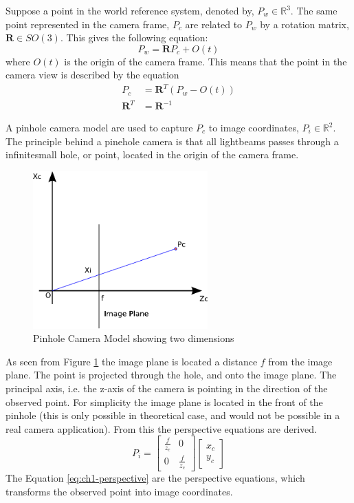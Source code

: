 	Suppose a point in the world reference system, denoted by, $P_w \in \mathbb{R}^3$. The same point
	represented in the camera frame, $P_c$ are related to $P_w$ by a rotation matrix, $\mathbf{R} \in
	SO(3)$. This gives the following equation: 
	\begin{equation}
		P_w = \mathbf{R} P_c + O(t)
	\end{equation}
	where $O(t)$ is the origin of the camera frame. This means that the point in the camera view is
	described by the equation
	\begin{align}
		\label{eq:ch1-P_c}
		P_c &= \mathbf{R}^T (P_w - O(t)) \\
		\mathbf{R}^T &= \mathbf{R}^{-1} 
	\end{align}

	A pinhole camera model are used to capture $P_c$ to image coordinates, $P_i \in
	\mathbb{R}^2$. 
	The principle behind a pinehole camera is that all lightbeams passes through a
	infinitesmall hole, or point, located in the origin of the camera frame.   
	\begin{figure}[hbtp]
		\centering
		\includegraphics[width=0.6\textwidth]{pics/pinhole_model}
		\caption{Pinhole Camera Model showing two dimensions}
		\label{fig:ch1-pinhole}
	\end{figure}
			
	As seen from Figure \ref{fig:ch1-pinhole} the image plane is located a distance $f$ from the image plane. 
	The point is projected through the hole, and onto the image plane. The principal axis, i.e. the z-axis of the
	camera is pointing
	in the direction of the observed point. For simplicity the image plane is located in the front of the
	pinhole (this is only possible in theoretical case, and would not be possible in a real camera application).
    From this the perspective equations are derived. \cite{robotbok}
	\begin{equation}
		\label{eq:ch1-perspective}
		P_i = \left[ \begin{array}{cc}
					\frac{f}{z_c} & 0 \\
					0	& \frac{f}{z_c} 
				\end{array} \right] 
				\left[ \begin{array}{c}
					x_c \\
					y_c
					\end{array} \right]
	\end{equation}
	The Equation \eqref{eq:ch1-perspective} are the perspective equations, which transforms the observed 
	point into image coordinates. 

